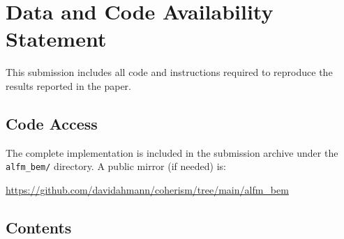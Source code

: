\documentclass[11pt]{article}
\begin{document}
\section*{Data and Code Availability Statement}

This submission includes all code and instructions required to reproduce the results reported in the paper.

\subsection*{Code Access}

The complete implementation is included in the submission archive under the \texttt{alfm\_bem/} directory. A public mirror (if needed) is:
\begin{center}
\url{https://github.com/davidahmann/coherism/tree/main/alfm_bem}
\end{center}

\subsection*{Contents}
\end{document}
